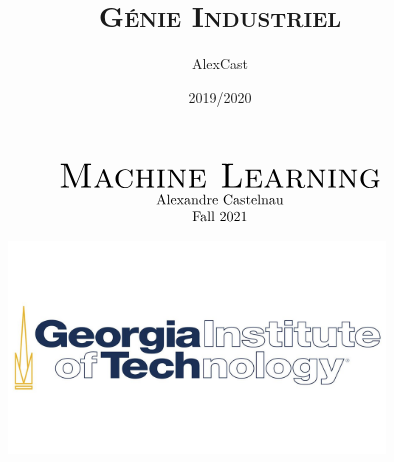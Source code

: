 \documentclass[15pt]{article}
\title{\LARGE\textsc{{Génie Industriel}}}
\author{AlexCast}
\date{2019/2020}
\begin{document}
\begin{titlepage}
\begin{center}
$$   \begin{array}{cc}
        \mbox{\Huge\textsc{{Machine Learning}}}\\
        \mbox{Alexandre Castelnau}\\
        \mbox{Fall 2021}
    \end{array}$$
\end{center}
\begin{figure}[b]
    \centering
    \includegraphics[width=10cm]{GT-logo.jpg}
\end{figure}
\end{titlepage}
\newpage

\tableofcontents
\newpage
\end{document}
